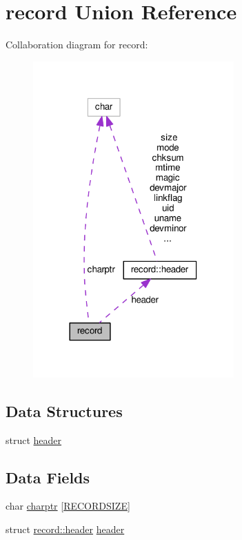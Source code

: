\hypertarget{unionrecord}{}\section{record Union Reference}
\label{unionrecord}


Collaboration diagram for record\+:
\nopagebreak
\begin{figure}[H]
\begin{center}
\leavevmode
\includegraphics[width=218pt]{unionrecord__coll__graph}
\end{center}
\end{figure}
\subsection*{Data Structures}
\begin{DoxyCompactItemize}
\item 
struct \hyperlink{structrecord_1_1header}{header}
\end{DoxyCompactItemize}
\subsection*{Data Fields}
\begin{DoxyCompactItemize}
\item 
char \hyperlink{unionrecord_a2e58755581f4fa53c972c57b7fa1d351}{charptr} \mbox{[}\hyperlink{mod__mime__magic_8c_a142eb20bd755ff0a9dbf6328ea0a380e}{R\+E\+C\+O\+R\+D\+S\+I\+ZE}\mbox{]}
\item 
struct \hyperlink{structrecord_1_1header}{record\+::header} \hyperlink{unionrecord_a0d6ac40b4dbeec30d271c6c7d5edfd90}{header}
\end{DoxyCompactItemize}


